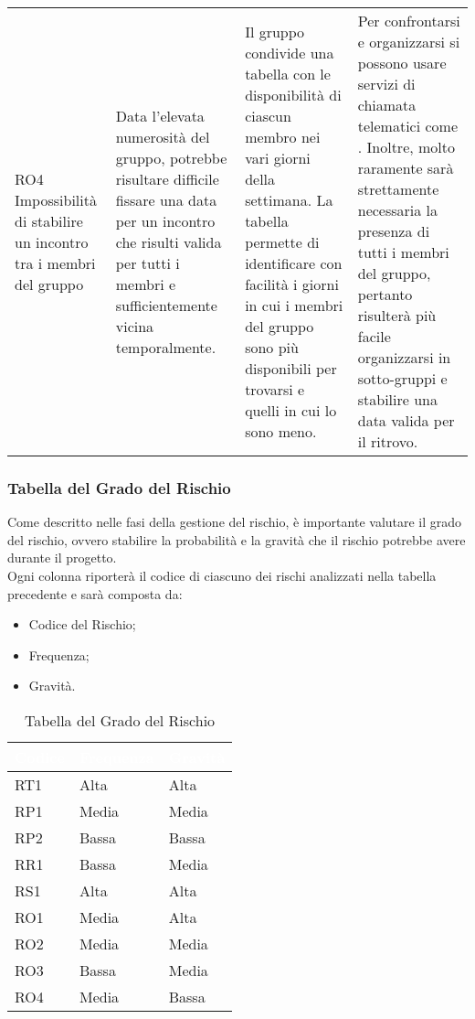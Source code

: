 {\begin{longtable}{ C{2.1cm} C{4cm} C{4cm} C{4.9cm}}
RO4 \newline Impossibilità di stabilire un incontro tra i membri del gruppo &
Data l'elevata numerosità del gruppo, potrebbe risultare difficile fissare una data per un incontro che risulti valida per tutti i membri e sufficientemente vicina temporalmente. &
Il gruppo condivide una tabella con le disponibilità di ciascun membro nei vari giorni della settimana. La tabella permette di identificare con facilità i giorni in cui i membri del gruppo sono più disponibili per trovarsi e quelli in cui lo sono meno. &
Per confrontarsi e organizzarsi si possono usare servizi di chiamata telematici come . Inoltre, molto raramente sarà strettamente necessaria la presenza di tutti i membri del gruppo, pertanto risulterà più facile organizzarsi in sotto-gruppi e stabilire una data valida per il ritrovo. \\

\end{longtable}
}

\subsubsection{Tabella del Grado del Rischio}
Come descritto nelle fasi della gestione del rischio, è importante valutare il grado del rischio, ovvero stabilire la probabilità e la gravità che il rischio potrebbe avere durante il progetto.\\
Ogni colonna riporterà il codice di ciascuno dei rischi analizzati nella tabella precedente e sarà composta da:
\begin{itemize}
	\item Codice del Rischio;
	\item Frequenza;
	\item Gravità.
\end{itemize}

{
\renewcommand{\arraystretch}{2}
\centering
	
\begin{longtable}{C{2cm} C{3cm} C{3cm}}
\caption{Tabella del Grado del Rischio}\\

\textcolor{white}{\textbf{Codice}} & 
\textcolor{white}{\textbf{Frequenza}} & 
\textcolor{white}{\textbf{Gravità}}\\	
\endhead

RT1 &  Alta & Alta \\
RP1 & Media & Media \\
RP2 & Bassa & Bassa \\
RR1 & Bassa & Media \\
RS1 &  Alta &  Alta \\
RO1 & Media &  Alta \\
RO2 & Media & Media \\
RO3 & Bassa & Media \\
RO4 &  Media & Bassa \\

\end{longtable}
}

\clearpage